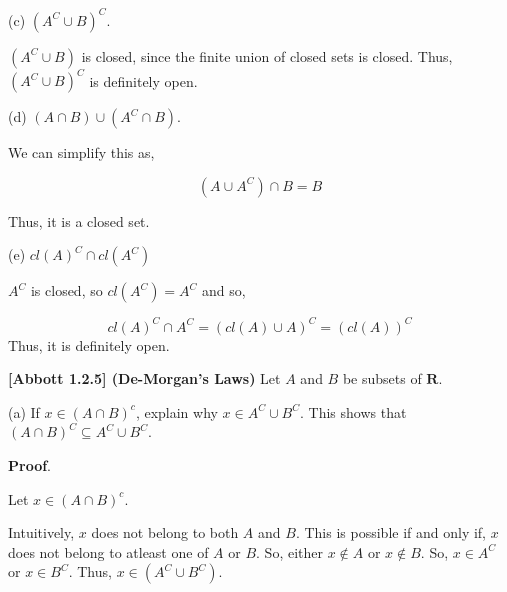 \documentclass[10pt]{article}
\begin{document}
(c) $\displaystyle \left( A^{C} \cup B\right)^{C}$.



$\displaystyle \left( A^{C} \cup B\right)$ is closed, since the finite union of closed sets is closed. Thus, $\displaystyle \left( A^{C} \cup B\right)^{C}$ is definitely open. 



(d) $\displaystyle ( A\cap B) \cup \left( A^{C} \cap B\right)$.



We can simplify this as,


\begin{equation*}
\left( A\cup A^{C}\right) \cap B=B
\end{equation*}


Thus, it is a closed set.



(e) $\displaystyle cl( A)^{C} \cap cl\left( A^{C}\right)$



$\displaystyle A^{C}$ is closed, so $\displaystyle cl\left( A^{C}\right) =A^{C}$ and so,


\begin{equation*}
cl( A)^{C} \cap A^{C} =( cl( A) \cup A)^{C} =( cl( A))^{C}
\end{equation*}
Thus, it is definitely open.



\textbf{[Abbott 1.2.5] (De-Morgan's Laws)} Let $\displaystyle A$ and $\displaystyle B$ be subsets of $\displaystyle \mathbf{R}$.



(a) If $\displaystyle x\in ( A\cap B)^{c}$, explain why $\displaystyle x\in A^{C} \cup B^{C}$. This shows that $\displaystyle ( A\cap B)^{C} \subseteq A^{C} \cup B^{C}$.



\textbf{Proof}.



Let $\displaystyle x\in ( A\cap B)^{c}$. 



Intuitively, $\displaystyle x$ does not belong to both $\displaystyle A$ and $\displaystyle B$. This is possible if and only if, $\displaystyle x$ does not belong to atleast one of $\displaystyle A$ or $\displaystyle B$. So, either $\displaystyle x\notin A$ or $\displaystyle x\notin B$. So, $\displaystyle x\in A^{C}$ or $\displaystyle x\in B^{C}$. Thus, $\displaystyle x\in \left( A^{C} \cup B^{C}\right)$. 
\end{document}
